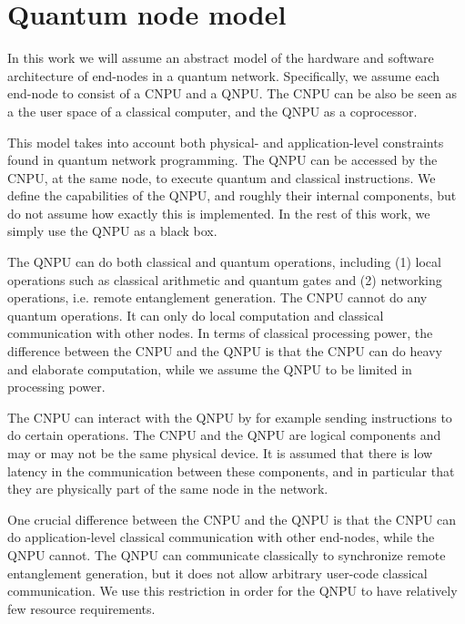 \section{Quantum node model}
\label{netqasm:sec:abstract_model}

In this work we will assume an abstract model of the hardware and software architecture of end-nodes in a quantum network.
Specifically, we assume each end-node to consist of a \acf{CNPU} and a \acf{QNPU}.
The \ac{CNPU} can be also be seen as a the user space of a classical computer, and the \ac{QNPU} as a coprocessor.

This model takes into account both physical- and application-level constraints found in quantum network programming.
The \ac{QNPU} can be accessed by the \ac{CNPU}, at the same node, to execute quantum and classical instructions.
We define the capabilities of the \ac{QNPU}, and roughly their internal components, but do not assume how exactly this is implemented.
In the rest of this work, we simply use the \ac{QNPU} as a black box.

The \ac{QNPU} can do both classical and quantum operations, including
    (1) local operations such as classical arithmetic and quantum gates and
    (2) networking operations, i.e. remote entanglement generation.
The \ac{CNPU} cannot do any quantum operations.
It can only do local computation and classical communication with other nodes.
In terms of classical processing power, the difference between the \ac{CNPU} and the \ac{QNPU} is that the \ac{CNPU} can do heavy and elaborate computation, while we assume the \ac{QNPU} to be limited in processing power.

The \ac{CNPU} can interact with the \ac{QNPU} by for example sending instructions to do certain operations.
The \ac{CNPU} and the \ac{QNPU} are logical components and may or may not be the same physical device.
It is assumed that there is low latency in the communication between these components, and in particular that they are physically part of the same node in the network.

One crucial difference between the \ac{CNPU} and the \ac{QNPU} is that the \ac{CNPU} can do application-level classical communication with other end-nodes, while the \ac{QNPU} cannot.
The \ac{QNPU} can communicate classically to synchronize remote entanglement generation, but it does not allow arbitrary user-code classical communication.
We use this restriction in order for the \ac{QNPU} to have relatively few resource requirements.

